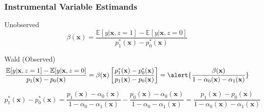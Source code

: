 \documentclass{beamer}
\begin{document}
\begin{frame}
  \frametitle{Instrumental Variable Estimands}
  \begin{block}{Unobserved}
  \[
    \beta(\mathbf{x}) = \frac{\mathbb{E}[y|\mathbf{x},z=1] - \mathbb{E}[y|\mathbf{x},z=0]}{p^*_1(\mathbf{x}) - p^*_0(\mathbf{x})} 
  \]
  \end{block}

  \begin{block}{Wald (Observed)}
    \vspace{-1em}
    \small
    \[
      \frac{\mathbb{E}[y|\mathbf{x},z=1] - \mathbb{E}[y|\mathbf{x},z=0]}{p_1(\mathbf{x}) - p_0(\mathbf{x})} = \beta(\mathbf{x})\left[ \frac{p_1^*(\mathbf{x}) - p_0^*(\mathbf{x})}{p_1(\mathbf{x}) - p_0(\mathbf{x})} \right] = \alert{\frac{\beta(\mathbf{x})}{1 - \alpha_0(\mathbf{x}) - \alpha_1(\mathbf{x})} }
    \]
   
    \vspace{2em}
    \scriptsize
    \[
      \boxed{p_1^*(\mathbf{x}) - p_0^*(\mathbf{x}) = \frac{p_1(\mathbf{x}) - \alpha_0(\mathbf{x})}{1 - \alpha_0 - \alpha_1(\mathbf{x})} -   \frac{p_0(\mathbf{x}) - \alpha_0(\mathbf{x})}{1 - \alpha_0 - \alpha_1(\mathbf{x})} = \frac{p_1(\mathbf{x}) - p_0(\mathbf{x})}{1 - \alpha_0(\mathbf{x}) - \alpha_1(\mathbf{x})}}
    \]
  \end{block}
\end{frame}
\end{document}
